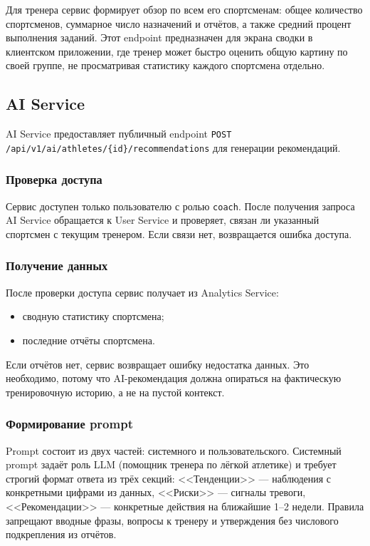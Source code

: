 Для тренера сервис формирует обзор по всем его спортсменам: общее количество спортсменов, суммарное число назначений и отчётов, а также средний процент выполнения заданий. Этот endpoint предназначен для экрана сводки в клиентском приложении, где тренер может быстро оценить общую картину по своей группе, не просматривая статистику каждого спортсмена отдельно.

\subsection{AI Service}

AI Service предоставляет публичный endpoint \lstinline!POST /api/v1/ai/athletes/{id}/recommendations! для генерации рекомендаций.

\subsubsection{Проверка доступа}

Сервис доступен только пользователю с ролью \passthrough{\lstinline!coach!}. После получения запроса AI Service обращается к User Service и проверяет, связан ли указанный спортсмен с текущим тренером. Если связи нет, возвращается ошибка доступа.

\subsubsection{Получение данных}

После проверки доступа сервис получает из Analytics Service:

\begin{itemize}
\tightlist
\item
  сводную статистику спортсмена;
\item
  последние отчёты спортсмена.
\end{itemize}

Если отчётов нет, сервис возвращает ошибку недостатка данных. Это необходимо, потому что AI-рекомендация должна опираться на фактическую тренировочную историю, а не на пустой контекст.

\subsubsection{Формирование prompt}

Prompt состоит из двух частей: системного и пользовательского. Системный prompt задаёт роль LLM (помощник тренера по лёгкой атлетике) и требует строгий формат ответа из трёх секций: <<Тенденции>> --- наблюдения с конкретными цифрами из данных, <<Риски>> --- сигналы тревоги, <<Рекомендации>> --- конкретные действия на ближайшие 1--2 недели. Правила запрещают вводные фразы, вопросы к тренеру и утверждения без числового подкрепления из отчётов.

